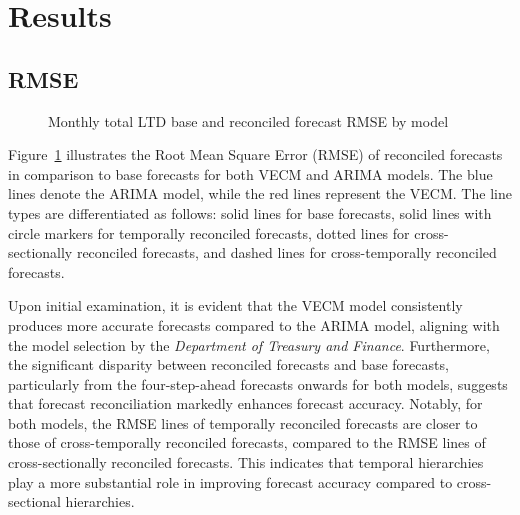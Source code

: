 \documentclass[
  11pt,
  a4paper,
]{article}
\begin{document}
\section{Results}\label{results}

\subsection{RMSE}\label{rmse}

\begin{figure}


\caption{\label{fig-rmse}Monthly total LTD base and reconciled forecast
RMSE by model}

\end{figure}%

Figure~\ref{fig-rmse} illustrates the Root Mean Square Error (RMSE) of
reconciled forecasts in comparison to base forecasts for both VECM and
ARIMA models. The blue lines denote the ARIMA model, while the red lines
represent the VECM. The line types are differentiated as follows: solid
lines for base forecasts, solid lines with circle markers for temporally
reconciled forecasts, dotted lines for cross-sectionally reconciled
forecasts, and dashed lines for cross-temporally reconciled forecasts.

Upon initial examination, it is evident that the VECM model consistently
produces more accurate forecasts compared to the ARIMA model, aligning
with the model selection by the \emph{Department of Treasury and
Finance}. Furthermore, the significant disparity between reconciled
forecasts and base forecasts, particularly from the four-step-ahead
forecasts onwards for both models, suggests that forecast reconciliation
markedly enhances forecast accuracy. Notably, for both models, the RMSE
lines of temporally reconciled forecasts are closer to those of
cross-temporally reconciled forecasts, compared to the RMSE lines of
cross-sectionally reconciled forecasts. This indicates that temporal
hierarchies play a more substantial role in improving forecast accuracy
compared to cross-sectional hierarchies.
\end{document}
